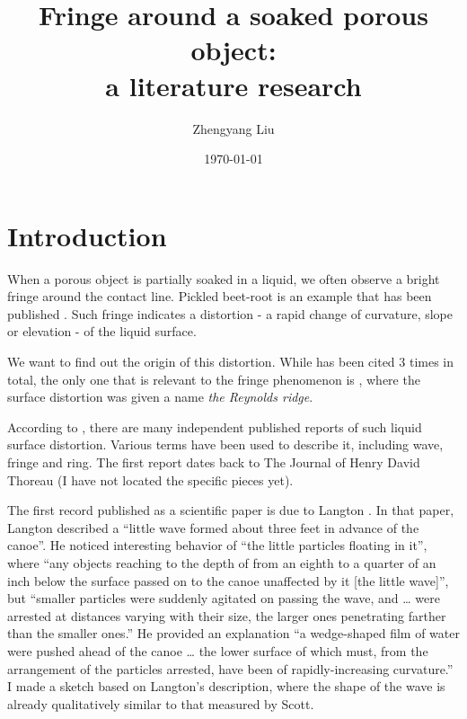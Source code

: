 \documentclass[12pt]{article}
\title{Fringe around a soaked porous object: \\ a literature research}
\author{Zhengyang Liu}
\date{\today}
\begin{document}
\maketitle

\section{Introduction}

When a porous object is partially soaked in a liquid, we often observe a bright fringe around the contact line. Pickled beet-root is an example that has been published \cite{Satterly1956}. Such fringe indicates a distortion - a rapid change of curvature, slope or elevation - of the liquid surface. 

We want to find out the origin of this distortion. While \cite{Satterly1956} has been cited 3 times in total, the only one that is relevant to the fringe phenomenon is \cite{Scott1982}, where the surface distortion was given a name \emph{the Reynolds ridge}.

According to \cite{Scott1982}, there are many independent published reports of such liquid surface distortion. Various terms have been used to describe it, including wave, fringe and ring. The first report dates back to The Journal of Henry David Thoreau \cite{Thoreau2009} (I have not located the specific pieces yet). 

The first record published as a scientific paper is due to Langton \cite{Langton1872}. In that paper, Langton described a “little wave formed about three feet in advance of the canoe”. He noticed interesting behavior of “the little particles floating in it”, where “any objects reaching to the depth of from an eighth to a quarter of an inch below the surface passed on to the canoe unaffected by it [the little wave]”, but “smaller particles were suddenly agitated on passing the wave, and … were arrested at distances varying with their size, the larger ones penetrating farther than the smaller ones.” He provided an explanation “a wedge-shaped film of water were pushed ahead of the canoe … the lower surface of which must, from the arrangement of the particles arrested, have been of rapidly-increasing curvature.” I made a sketch based on Langton’s description, where the shape of the wave is already qualitatively similar to that measured by Scott.
\end{document}
